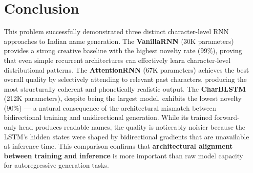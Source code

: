 \documentclass[11pt,a4paper]{article}
\begin{document}
\section{Conclusion}
This problem successfully demonstrated three distinct character-level RNN approaches to Indian name generation. The \textbf{VanillaRNN} (30K parameters) provides a strong creative baseline with the highest novelty rate (99\%), proving that even simple recurrent architectures can effectively learn character-level distributional patterns. The \textbf{AttentionRNN} (67K parameters) achieves the best overall quality by selectively attending to relevant past characters, producing the most structurally coherent and phonetically realistic output. The \textbf{CharBLSTM} (212K parameters), despite being the largest model, exhibits the lowest novelty (90\%) — a natural consequence of the architectural mismatch between bidirectional training and unidirectional generation. While its trained forward-only head produces readable names, the quality is noticeably noisier because the LSTM's hidden states were shaped by bidirectional gradients that are unavailable at inference time. This comparison confirms that \textbf{architectural alignment between training and inference} is more important than raw model capacity for autoregressive generation tasks.
\end{document}
